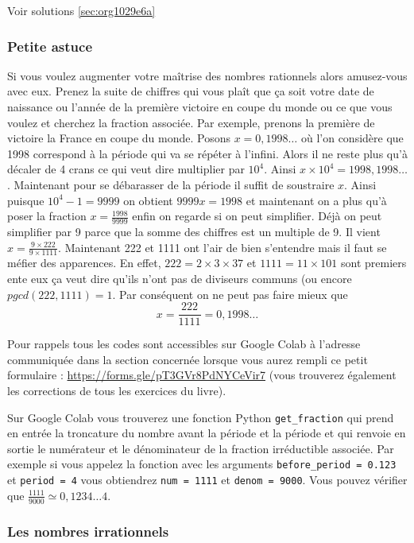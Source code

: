 \documentclass[a4paper, 11pt, twoside]{article}
\begin{document}
Voir solutions \ref{sec:org1029e6a}

\subsubsection{Petite astuce}
\label{sec:orgb56332d}
Si vous voulez augmenter votre maîtrise des nombres rationnels
alors amusez-vous avec eux. Prenez la suite de chiffres qui vous
plaît que ça soit votre date de naissance ou l'année de la
première victoire en coupe du monde ou ce que vous voulez et
cherchez la fraction associée. Par exemple, prenons la première
de victoire la France en coupe du monde. Posons \(x = 0,1998\dots\)
où l'on considère que 1998 correspond à la période qui va se
répéter à l'infini. Alors il ne reste plus qu'à décaler de 4 crans
ce qui veut dire multiplier par \(10^4\). Ainsi \(x\times 10^4 =
    1998,1998\dots\). Maintenant pour se débarasser de la période il
suffit de soustraire \(x\). Ainsi puisque \(10^4 - 1 = 9999\) on
obtient \(9999x = 1998\) et maintenant on a plus qu'à poser la
fraction \(x = \frac{1998}{9999}\) enfin on regarde si on peut
simplifier. Déjà on peut simplifier par 9 parce que la somme des
chiffres est un multiple de 9. Il vient \(x = \frac{9\times
    222}{9\times 1111}\). Maintenant 222 et 1111 ont l'air de bien
s'entendre mais il faut se méfier des apparences. En effet, \(222 =
    2\times 3\times 37\) et \(1111 = 11\times 101\) sont premiers ente
eux ça veut dire qu'ils n'ont pas de diviseurs communs (ou encore
\(pgcd(222, 1111) = 1\). Par conséquent on ne peut pas faire mieux
que \[x = \dfrac{222}{1111} = 0,1998\dots\]


Pour rappels tous les codes sont accessibles sur Google Colab à
l'adresse communiquée dans la section concernée lorsque vous
aurez rempli ce petit formulaire :
\url{https://forms.gle/pT3GVr8PdNYCeVir7} (vous trouverez également
les corrections de tous les exercices du livre).

Sur Google Colab vous trouverez une fonction Python \texttt{get\_fraction}
qui prend en entrée la troncature du nombre avant la période et la
période et qui renvoie en sortie le numérateur et le dénominateur
de la fraction irréductible associée. Par exemple si vous appelez
la fonction avec les arguments \texttt{before\_period = 0.123} et \texttt{period
    = 4} vous obtiendrez \texttt{num = 1111} et \texttt{denom = 9000}. Vous pouvez
vérifier que \(\frac{1111}{9000} \simeq 0,1234\dots4\).

\subsubsection{Les nombres irrationnels}
\label{sec:orgd5cd8d4}
\end{document}
